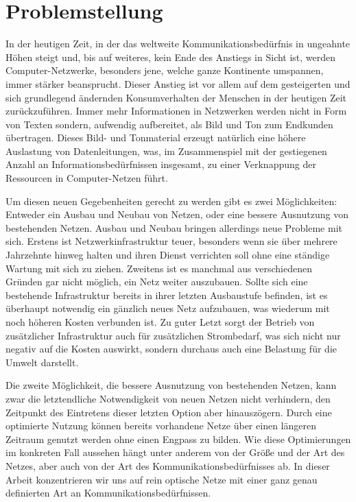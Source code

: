 \chapter{Problemstellung}
In der heutigen Zeit, in der das weltweite Kommunikationsbedürfnis in ungeahnte Höhen steigt und, bis auf weiteres, kein Ende des Anstiegs in Sicht ist, werden Computer-Netzwerke, besonders jene, welche ganze Kontinente umspannen, immer stärker beansprucht. Dieser Anstieg ist vor allem auf dem gesteigerten und sich grundlegend ändernden Konsumverhalten der Menschen in der heutigen Zeit zurückzuführen. Immer mehr Informationen in Netzwerken werden nicht in Form von Texten sondern, aufwendig aufbereitet, als Bild und Ton zum Endkunden übertragen. Dieses Bild- und Tonmaterial erzeugt natürlich eine höhere Auslastung von Datenleitungen, was, im Zusammenspiel mit der gestiegenen Anzahl an Informationsbedürfnissen insgesamt, zu einer Verknappung der Ressourcen in Computer-Netzen führt.

Um diesen neuen Gegebenheiten gerecht zu werden gibt es zwei Möglichkeiten: Entweder ein Ausbau und Neubau von Netzen, oder eine bessere Ausnutzung von bestehenden Netzen. Ausbau und Neubau bringen allerdings neue Probleme mit sich. Erstens ist Netzwerkinfrastruktur teuer, besonders wenn sie über mehrere Jahrzehnte hinweg halten und ihren Dienst verrichten soll ohne eine ständige Wartung mit sich zu ziehen. Zweitens ist es manchmal aus verschiedenen Gründen gar nicht möglich, ein Netz weiter auszubauen. Sollte sich eine bestehende Infrastruktur bereits in ihrer letzten Ausbaustufe befinden, ist es überhaupt notwendig ein gänzlich neues Netz aufzubauen, was wiederum mit noch höheren Kosten verbunden ist. Zu guter Letzt sorgt der Betrieb von zusätzlicher Infrastruktur auch für zusätzlichen Strombedarf, was sich nicht nur negativ auf die Kosten auswirkt, sondern durchaus auch eine Belastung für die Umwelt darstellt.

Die zweite Möglichkeit, die bessere Ausnutzung von bestehenden Netzen, kann zwar die letzt\-endliche Notwendigkeit von neuen Netzen nicht verhindern, den Zeitpunkt des Eintretens dieser letzten Option aber hinauszögern. Durch eine optimierte Nutzung können bereits vorhandene Netze über einen längeren Zeitraum genutzt werden ohne einen Engpass zu bilden. Wie diese Optimierungen im konkreten Fall aussehen hängt unter anderem von der Größe und der Art des Netzes, aber auch von der Art des Kommunikationsbedürfnisses ab. In dieser Arbeit konzentrieren wir uns auf rein optische Netze mit einer ganz genau definierten Art an Kommunikationsbedürfnissen.

